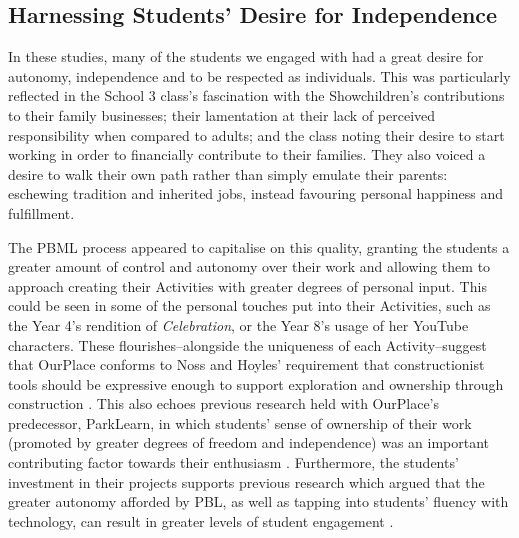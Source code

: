 \documentclass[,hyphens]{sigchi}
\begin{document}
\subsection{Harnessing Students' Desire for Independence}
In these studies, many of the students we engaged with had a great desire for autonomy, independence and to be respected as individuals. This was particularly reflected in the School 3 class's fascination with the Showchildren's contributions to their family businesses; their lamentation at their lack of perceived responsibility when compared to adults; and the class noting their desire to start working in order to financially contribute to their families. They also voiced a desire to walk their own path rather than simply emulate their parents: eschewing tradition and inherited jobs, instead favouring personal happiness and fulfillment. 

The PBML process appeared to capitalise on this quality, granting the students a greater amount of control and autonomy over their work and allowing them to approach creating their Activities with greater degrees of personal input. This could be seen in some of the personal touches put into their Activities, such as the Year 4's rendition of \textit{Celebration}, or the Year 8's usage of her YouTube characters. These flourishes--alongside the uniqueness of each Activity--suggest that OurPlace conforms to Noss and Hoyles' requirement that constructionist tools should be expressive enough to support exploration and ownership through construction \cite{Noss2017}. This also echoes previous research held with OurPlace's predecessor, ParkLearn, in which students' sense of ownership of their work (promoted by greater degrees of freedom and independence) was an important contributing factor towards their enthusiasm \cite{Richardson2018}. Furthermore, the students' investment in their projects supports previous research which argued that the greater autonomy afforded by PBL, as well as tapping into students' fluency with technology, can result in greater levels of student engagement \cite{Wurdinger2007, Bell2010}.
\end{document}
